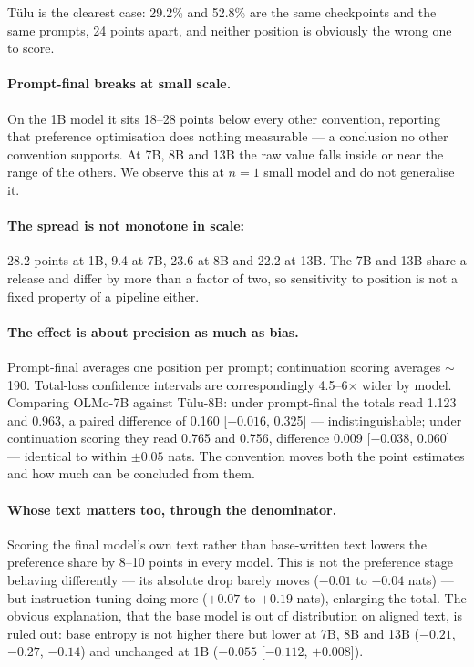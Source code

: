 \documentclass[11pt]{article}
\begin{document}
T\"ulu is the clearest case: 29.2\% and 52.8\% are the same checkpoints and the
same prompts, 24 points apart, and neither position is obviously the wrong one to
score.

\paragraph{Prompt-final breaks at small scale.} On the 1B model it sits 18--28
points below every other convention, reporting that preference optimisation does
nothing measurable --- a conclusion no other convention supports. At 7B, 8B and 13B
the raw value falls inside or near the range of the others. We observe this at
$n = 1$ small model and do not generalise it.

\paragraph{The spread is not monotone in scale:} 28.2 points at 1B, 9.4 at 7B, 23.6
at 8B and 22.2 at 13B. The 7B and 13B share a release and differ by more than a
factor of two, so sensitivity to position is not a fixed property of a pipeline
either.

\paragraph{The effect is about precision as much as bias.} Prompt-final averages one
position per prompt; continuation scoring averages $\sim$190. Total-loss confidence
intervals are correspondingly 4.5--6$\times$ wider by model. Comparing OLMo-7B
against T\"ulu-8B: under prompt-final the totals read 1.123 and 0.963, a paired
difference of 0.160 [$-0.016$, 0.325] --- indistinguishable; under continuation
scoring they read 0.765 and 0.756, difference 0.009 [$-0.038$, 0.060] --- identical
to within $\pm0.05$ nats. The convention moves both the point estimates and how
much can be concluded from them.

\paragraph{Whose text matters too, through the denominator.} Scoring the final
model's own text rather than base-written text lowers the preference share by 8--10
points in every model. This is not the preference stage behaving differently ---
its absolute drop barely moves ($-0.01$ to $-0.04$ nats) --- but instruction tuning
doing more ($+0.07$ to $+0.19$ nats), enlarging the total. The obvious explanation,
that the base model is out of distribution on aligned text, is ruled out: base
entropy is not higher there but lower at 7B, 8B and 13B ($-0.21$, $-0.27$, $-0.14$)
and unchanged at 1B ($-0.055$ [$-0.112$, $+0.008$]).
\end{document}
